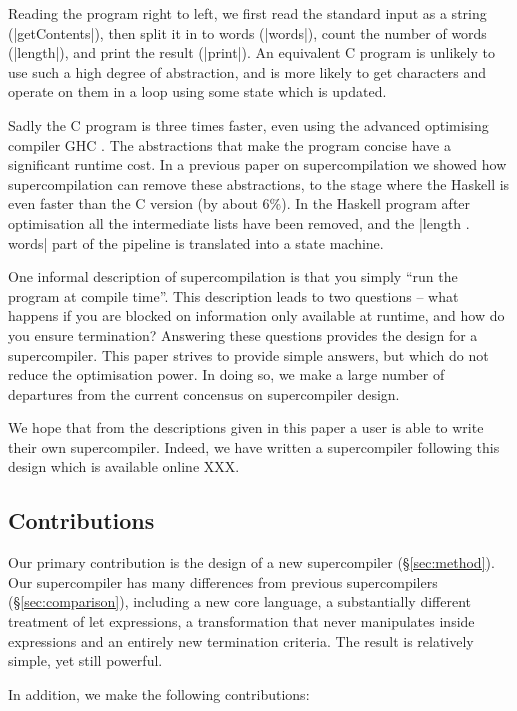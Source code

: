 \documentclass[draft]{sigplanconf}
\newcommand{\unknown}{XXX}
\begin{document}
Reading the program right to left, we first read the standard input as a string (|getContents|), then split it in to words (|words|), count the number of words (|length|), and print the result (|print|). An equivalent C program is unlikely to use such a high degree of abstraction, and is more likely to get characters and operate on them in a loop using some state which is updated.

Sadly the C program is three times faster, even using the advanced optimising compiler GHC \cite{GHC}. The abstractions that make the program concise have a significant runtime cost. In a previous paper on supercompilation \cite{me:supero} we showed how supercompilation can remove these abstractions, to the stage where the Haskell is even faster than the C version (by about 6\%). In the Haskell program after optimisation all the intermediate lists have been removed, and the |length . words| part of the pipeline is translated into a state machine.

One informal description of supercompilation is that you simply ``run the program at compile time''. This description leads to two questions -- what happens if you are blocked on information only available at runtime, and how do you ensure termination? Answering these questions provides the design for a supercompiler. This paper strives to provide simple answers, but which do not reduce the optimisation power. In doing so, we make a large number of departures from the current concensus on supercompiler design.

We hope that from the descriptions given in this paper a user is able to write their own supercompiler. Indeed, we have written a supercompiler following this design which is available online \unknown{}.

\subsection{Contributions}

Our primary contribution is the design of a new supercompiler (\S\ref{sec:method}). Our supercompiler has many differences from previous supercompilers (\S\ref{sec:comparison}), including a new core language, a substantially different treatment of let expressions, a transformation that never manipulates inside expressions and an entirely new termination criteria. The result is relatively simple, yet still powerful.

In addition, we make the following contributions:
\end{document}
